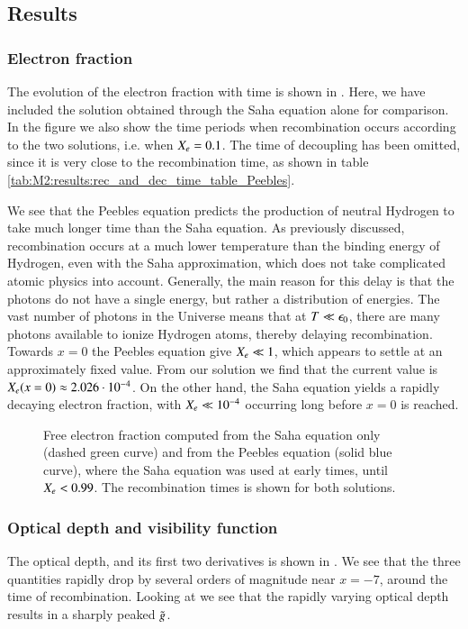 \subsection{Results}\label{ssec:M2:results}


\subsubsection{Electron fraction} \label{sssec:M2:results:electron_fraction}
The evolution of the electron fraction with time is shown in . Here, we have included the solution obtained through the Saha equation alone for comparison. In the figure we also show the time periods when recombination occurs according to the two solutions, i.e. when $X_e=0.1$. The time of decoupling has been omitted, since it is very close to the recombination time, as shown in table \ref{tab:M2:results:rec_and_dec_time_table_Peebles}. 

We see that the Peebles equation predicts the production of neutral Hydrogen to take much longer time than the Saha equation. As previously discussed, recombination occurs at a much lower temperature than the binding energy of Hydrogen, even with the Saha approximation, which does not take complicated atomic physics into account. Generally, the main reason for this delay is that the photons do not have a single energy, but rather a distribution of energies. The vast number of photons in the Universe means that at $T\ll\epsilon_0$, there are many photons available to ionize Hydrogen atoms, thereby delaying recombination. Towards $x=0$ the Peebles equation give $X_e\ll1$, which appears to settle at an approximately fixed value. From our solution we find that the current value is $X_e(x=0)\approx 2.026\cdot10^{-4}$. On the other hand, the Saha equation yields a rapidly decaying electron fraction, with $X_e\ll 10^{-4}$ occurring long before $x=0$ is reached.  

\begin{figure}[ht!]
    \caption{Free electron fraction computed from the Saha equation only (dashed green curve) and from the Peebles equation (solid blue curve), where the Saha equation was used at early times, until $X_e<0.99$. The recombination times is shown for both solutions.}
    \label{fig:M2:results:recombination_compare_Xe_peebles_saha}
\end{figure}

\subsubsection{Optical depth and visibility function} \label{sssec:M2:results:optical_depth_and_visibility_function}
The optical depth, and its first two derivatives is shown in . We see that the three quantities rapidly drop by several orders of magnitude near $x=-7$, around the time of recombination. Looking at  we see that the rapidly varying optical depth results in a sharply peaked $\tilde{g}$. 

